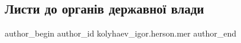  
 
 
 
 
 
\subsection{Листи до органів державної влади}
\label{sec:26_04_2022.fb.kolyhaev_igor.herson.mer.1.lysty}
 
\ifcmt
 author_begin
   author_id kolyhaev_igor.herson.mer
 author_end
\fi

